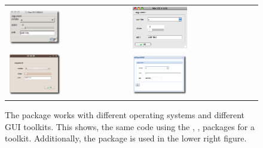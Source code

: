 \begin{figure}
  \centering
  \begin{tabular}{ll}
    \includegraphics[width=0.45\textwidth]{ex-33-macosx-rgtk2} &
    \includegraphics[width=0.45\textwidth]{fig-gWidgets-ex-33-tlctk}\\
    \includegraphics[width=0.45\textwidth]{ex-33-linux-qt} &
    \includegraphics[width=0.45\textwidth]{ex-33-gWidgetsWWW}
  \end{tabular}
  \caption{The  package works with different operating
    systems and different GUI toolkits. This shows, the same code using the
    , ,  packages for a toolkit. Additionally,
    the  package is used in the lower right figure.}
  \label{fig:gWidgets-three-oses}
\end{figure}


